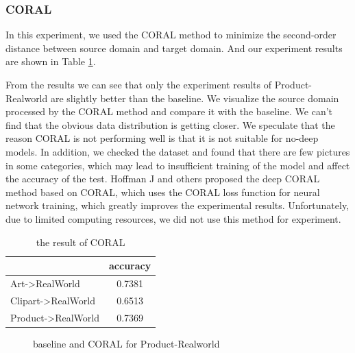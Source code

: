 \documentclass[conference]{IEEEtran}
\begin{document}
\subsubsection{CORAL}
In this experiment, we used the CORAL method to minimize the second-order distance between source domain and target domain. And our experiment results are shown in Table \ref{tab:CORAL}.\par
From the results we can see that only the experiment results of Product-Realworld are slightly better than the baseline. We visualize the source domain processed by the CORAL method and compare it with the baseline. We can't find that the obvious data distribution is getting closer. We speculate that the reason CORAL is not performing well is that it is not suitable for no-deep models. In addition, we checked the dataset and found that there are few pictures in some categories, which may lead to insufficient training of the model and affect the accuracy of the test. Hoffman J and others proposed the deep CORAL method based on CORAL\cite{tzeng2017adversarial}, which uses the CORAL loss function for neural network training, which greatly improves the experimental results. Unfortunately, due to limited computing resources, we did not use this method for experiment.
\begin{table}[H]
	\centering
	\caption{the result of CORAL}
\begin{tabular}{|l|c|}
	\hline
	\diagbox{dataset}{result} & accuracy \\
	\hline
	Art->RealWorld & 0.7381 \\
	\hline
	Clipart->RealWorld & 0.6513 \\
	\hline
	Product->RealWorld & 0.7369 \\
	\hline
\end{tabular}\label{tab:CORAL}
\end{table}

\begin{center}
	\begin{figure}[H]
		\centering
		\quad
		\caption{baseline and CORAL for Product-Realworld}
		\label{fig:CORAL}
	\end{figure}
\end{center}
\end{document}
